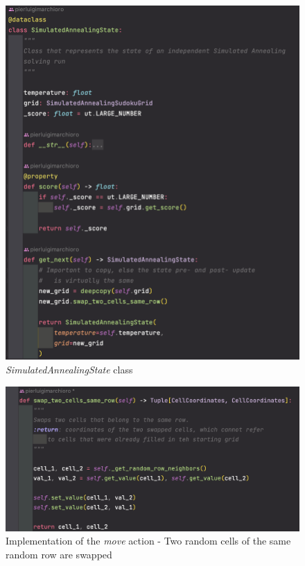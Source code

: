 \begin{figure}[h]
    \centering
    \includegraphics[scale=0.5]{assignment-1/images/sim_ann/neighbors-1-sim_ann_state.png}
    \caption{\textit{SimulatedAnnealingState} class}
    \label{fig:ann_state_1}
\end{figure}

\begin{figure}[h]
    \centering
    \includegraphics[scale=0.65]{assignment-1/images/sim_ann/neighbors-2-swap.png}
    \caption{Implementation of the \textit{move} action - Two random cells of the same random row are swapped}
    \label{fig:ann_state_2_swap}
\end{figure}


